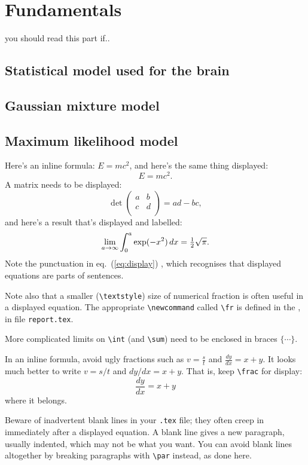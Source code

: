 \section{Fundamentals}
you should read this part if..
\subsection{Statistical model used for the brain}
\subsection{Gaussian mixture model}
\subsection{Maximum likelihood model}
Here's an inline formula: \(E=mc^2\), and here's the same
thing displayed:\[E=mc^2.\]A matrix needs to be displayed:
\[  \det\left(\begin{array}{cc}
        a & b \\  c & d \\
      \end{array}\right) = ad-bc,   \]
and here's a result that's displayed and labelled:
\begin{equation}\label{eq:display}
\lim_{a\to\infty}\int_0^a\exp(-x^2)\,dx={\textstyle\frac{1}{2}}\sqrt\pi.
\end{equation}Note the punctuation in eq.~(\ref{eq:display}) \etc,
which recognises that displayed equations are parts of sentences.
\par
Note also that a smaller (\verb+\textstyle+) size of numerical fraction
is often useful in a displayed equation. The appropriate
\verb+\newcommand+ called \verb+\fr+ is defined in the
, in file \texttt{report.tex}.
\par
More complicated limits on \verb+\int+ (and \verb+\sum+) need to
be enclosed in braces $\{\cdots\}$.
\par
In an inline formula, avoid ugly fractions such as \(v=\frac st\) and
\(\frac{dy}{dx}=x+y\). It looks much better to write \(v=s/t\) and
\(dy/dx=x+y\). That is, keep \verb+\frac+ for
display:\[\frac{dy}{dx}=x+y\]where it belongs.
\par
Beware of inadvertent blank lines in your \texttt{.tex} file; they often
creep in immediately after a displayed equation. A blank line gives a
new paragraph, usually indented, which may not be what you want. You can 
avoid blank lines altogether by breaking paragraphs with \verb+\par+
instead, as done here.
%

